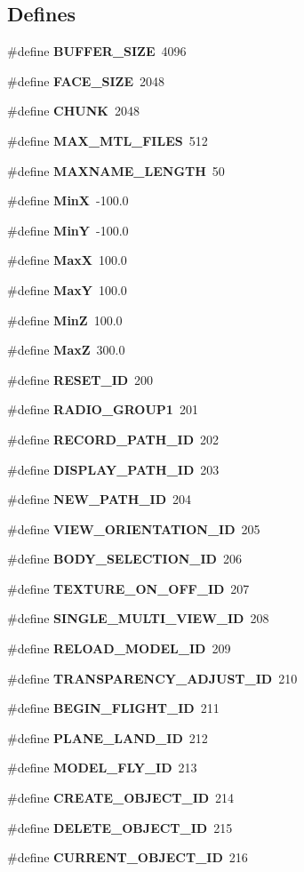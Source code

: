 \subsection*{Defines}
\begin{CompactItemize}
\item 
\#define {\bf BUFFER\_\-SIZE}\ 4096
\item 
\#define {\bf FACE\_\-SIZE}\ 2048
\item 
\#define {\bf CHUNK}\ 2048
\item 
\#define {\bf MAX\_\-MTL\_\-FILES}\ 512
\item 
\#define {\bf MAXNAME\_\-LENGTH}\ 50
\item 
\#define {\bf Min\-X}\ -100.0
\item 
\#define {\bf Min\-Y}\ -100.0
\item 
\#define {\bf Max\-X}\ 100.0
\item 
\#define {\bf Max\-Y}\ 100.0
\item 
\#define {\bf Min\-Z}\ 100.0
\item 
\#define {\bf Max\-Z}\ 300.0
\item 
\#define {\bf RESET\_\-ID}\ 200
\item 
\#define {\bf RADIO\_\-GROUP1}\ 201
\item 
\#define {\bf RECORD\_\-PATH\_\-ID}\ 202
\item 
\#define {\bf DISPLAY\_\-PATH\_\-ID}\ 203
\item 
\#define {\bf NEW\_\-PATH\_\-ID}\ 204
\item 
\#define {\bf VIEW\_\-ORIENTATION\_\-ID}\ 205
\item 
\#define {\bf BODY\_\-SELECTION\_\-ID}\ 206
\item 
\#define {\bf TEXTURE\_\-ON\_\-OFF\_\-ID}\ 207
\item 
\#define {\bf SINGLE\_\-MULTI\_\-VIEW\_\-ID}\ 208
\item 
\#define {\bf RELOAD\_\-MODEL\_\-ID}\ 209
\item 
\#define {\bf TRANSPARENCY\_\-ADJUST\_\-ID}\ 210
\item 
\#define {\bf BEGIN\_\-FLIGHT\_\-ID}\ 211
\item 
\#define {\bf PLANE\_\-LAND\_\-ID}\ 212
\item 
\#define {\bf MODEL\_\-FLY\_\-ID}\ 213
\item 
\#define {\bf CREATE\_\-OBJECT\_\-ID}\ 214
\item 
\#define {\bf DELETE\_\-OBJECT\_\-ID}\ 215
\item 
\#define {\bf CURRENT\_\-OBJECT\_\-ID}\ 216

\end{CompactItemize}
